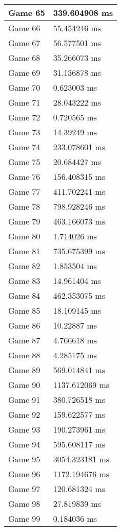 \begin{multicols}{2}
\begin{tabular}{|l|l|}
	Game 65 & 339.604908 ms \\ \hline
	Game 66 & 55.454246 ms \\ \hline
	Game 67 & 56.577501 ms \\ \hline
	Game 68 & 35.266073 ms \\ \hline
	Game 69 & 31.136878 ms \\ \hline
	Game 70 & 0.623003 ms \\ \hline
	Game 71 & 28.043222 ms \\ \hline
	Game 72 & 0.720565 ms \\ \hline
	Game 73 & 14.39249 ms \\ \hline
	Game 74 & 233.078601 ms \\ \hline
	Game 75 & 20.684427 ms \\ \hline
	Game 76 & 156.408315 ms \\ \hline
	Game 77 & 411.702241 ms \\ \hline
	Game 78 & 798.928246 ms \\ \hline
	Game 79 & 463.166073 ms \\ \hline
	Game 80 & 1.714026 ms \\ \hline
	Game 81 & 735.675399 ms \\ \hline
	Game 82 & 1.853504 ms \\ \hline
	Game 83 & 14.961404 ms \\ \hline
	Game 84 & 462.353075 ms \\ \hline
	Game 85 & 18.109145 ms \\ \hline
	Game 86 & 10.22887 ms \\ \hline
	Game 87 & 4.766618 ms \\ \hline
	Game 88 & 4.285175 ms \\ \hline
	Game 89 & 569.014841 ms \\ \hline
	Game 90 & 1137.612069 ms \\ \hline
	Game 91 & 380.726518 ms \\ \hline
	Game 92 & 159.622577 ms \\ \hline
	Game 93 & 190.273961 ms \\ \hline
	Game 94 & 595.608117 ms \\ \hline
	Game 95 & 3054.323181 ms \\ \hline
	Game 96 & 1172.194676 ms \\ \hline
	Game 97 & 120.681324 ms \\ \hline
	Game 98 & 27.819839 ms \\ \hline
	Game 99 & 0.184036 ms \\ \hline

\end{tabular}
\end{multicols}
